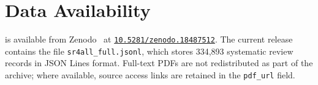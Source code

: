 \section*{Data Availability}

\webisSRCorpus{} is available from Zenodo~\cite{achkar:2026sr4all} at \href{https://doi.org/10.5281/zenodo.18487512}{\texttt{10.5281/zenodo.18487512}}. The current release contains the file \texttt{sr4all\_full.jsonl}, which stores 334,893 systematic review records in JSON Lines format. Full-text PDFs are not redistributed as part of the archive; where available, source access links are retained in the \texttt{pdf\_url} field.
